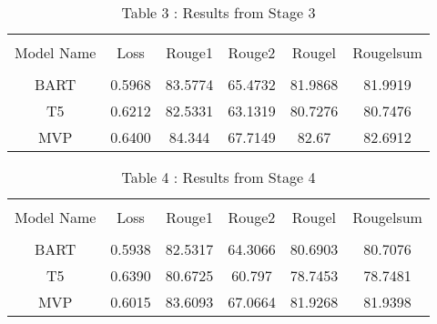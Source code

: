 \documentclass{article}
\begin{document}
\begin{center}
\begin{table}[h]
\vspace{0.4cm} 
\hspace*{3cm}\begin{tabular}{c c c c c c} 
\\
\hline \\[1ex]  
 Model Name    & Loss     & Rouge1   & Rouge2 & Rougel & Rougelsum \\ [1ex] 
 \hline \\[0.2ex]
 BART & 0.5968 & 83.5774 & 65.4732 & 81.9868 & 81.9919 \\ 
 [1ex] 

 T5 & 0.6212 & 82.5331 & 63.1319 & 80.7276 & 80.7476\\
 [1ex] 

 MVP & 0.6400 & 84.344 & 67.7149 & 82.67 & 82.6912\\
 [1ex] 
 \hline
\end{tabular}
\caption{Table 3 : Results from Stage 3}
 \end{table}
\end{center}

\begin{center}
\begin{table}[h]
\vspace{0.4cm} 
\hspace*{3cm}\begin{tabular}{c c c c c c} 
\\
\hline \\[1ex]    
 Model Name    & Loss     & Rouge1   & Rouge2 & Rougel & Rougelsum \\ [1ex] 
 \hline \\[0.2ex]
 BART & 0.5938 & 82.5317 & 64.3066 & 80.6903 & 80.7076\\ 
 [1ex] 

 T5 & 0.6390 & 80.6725 & 60.797 & 78.7453 & 78.7481 \\
 [1ex] 

 MVP & 0.6015 & 83.6093 & 67.0664 & 81.9268 & 81.9398\\
 [1ex] 
 \hline
\end{tabular}
\caption{Table 4 : Results from Stage 4}
 \end{table}
\end{center}
\end{document}
